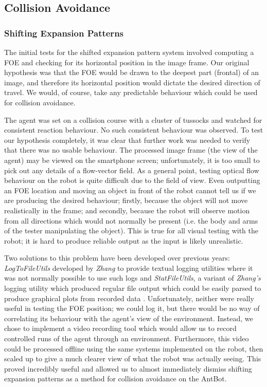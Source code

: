 \documentclass[a4paper,11pt,twoside,openright]{article}
\begin{document}
\subsection{Collision Avoidance}
\subsubsection{Shifting Expansion Patterns}
The initial tests for the shifted expansion pattern system involved computing
a FOE and checking for its horizontal position in the image frame. Our
original hypothesis was that the FOE would be drawn
to the deepest part (frontal) of an image, and therefore its horizontal position
would dictate the desired direction of travel. We would, of course, take any
predictable behaviour which could be used for collision avoidance.
\newline\par

The agent was set on a collision course with a cluster of tussocks and
watched for consistent reaction behaviour. No such consistent
behaviour was observed.  To test our hypothesis completely, it was
clear that further work was needed to verify that there was no usable
behaviour. The processed image frame (the view of the agent) may be
viewed on the smartphone screen; unfortunately, it is too small to
pick out any details of a flow-vector field. As a general point,
testing optical flow behaviour on the robot is quite difficult due to
the field of view. Even outputting an FOE location and moving an
object in front of the robot cannot tell us if we are producing the
desired behaviour; firstly, because the object will not move
realistically in the frame; and secondly, because the robot will
observe motion from all directions which would not normally be present
(i.e. the body and arms of the tester manipulating the object). This
is true for all visual testing with the robot; it is hard to produce
reliable output as the input is likely unrealistic.
\newline\par

Two solutions to this problem have been developed over previous years:
\textit{LogToFileUtils} developed by \textit{Zhang} to provide textual
logging utilities where it was not normally possible to use such logs
\cite{Zhang2017} and \textit{StatFileUtils}, a variant of
\textit{Zhang's} logging utility which produced regular file output
which could be easily parsed to produce graphical plots from recorded
data \cite{Mitchell2018}. Unfortunately, neither were really useful in
testing the FOE position; we could log it, but there would be no way
of correlating its behaviour with the agent's view of the
environment. Instead, we chose to implement a video recording tool
which would allow us to record controlled runs of the agent through an
environment. Furthermore, this video could be processed offline using
the same systems implemented on the robot, then scaled up to give a
much clearer view of what the robot was actually seeing.  This proved
incredibly useful and allowed us to almost immediately dismiss
shifting expansion patterns as a method for collision avoidance on the
AntBot.
\newline\par
\end{document}
